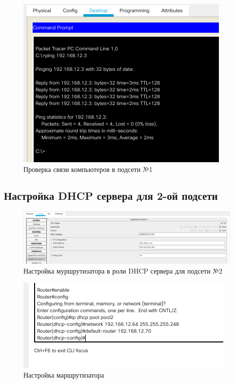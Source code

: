 \documentclass[12pt]{report}
\begin{document}
\begin{figure}[H]
	\begin{center}
		\includegraphics[scale=0.75]{img/4.png}
	\end{center}
	\caption{Проверка связи компьютеров в подсети №1}
	\label{fig:4}
\end{figure}

\subsection*{Настройка DHCP сервера для 2-ой подсети}

\begin{figure}[H]
	\begin{center}
		\includegraphics[scale=0.4]{img/5.png}
	\end{center}
	\caption{Настройка муршрутизатора в роли DHCP сервера для подсети №2}
	\label{fig:5}
\end{figure}

\begin{figure}[H]
	\begin{center}
		\includegraphics[scale=0.75]{img/6.png}
	\end{center}
	\caption{Настройка маршрутизатора}
	\label{fig:6}
\end{figure}
\end{document}
